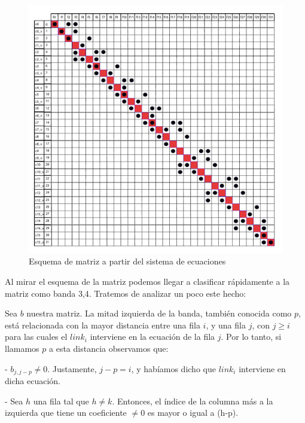 \begin{figure}[!h]
	\begin{center}
		  \includegraphics[scale=0.5]{Imagenes/im_2.pdf}
		  \caption{Esquema de matriz a partir del sistema de ecuaciones}
		  \label{fig:contra1}
	\end{center}
\end{figure}
\FloatBarrier

Al mirar el esquema de la matriz podemos llegar a clasificar rápidamente a la matriz como banda 3,4. Tratemos de analizar un poco este hecho:

Sea $b$ nuestra matriz. 
La mitad izquierda de la banda, también conocida como $p$, está relacionada con la mayor distancia entre una fila $i$, y una fila $j$, con $j \geq i$ para 
las cuales el $link_{i}$ interviene en la ecuación de la fila $j$. Por lo tanto, si llamamos $p$ a esta distancia observamos que:

- $b_{j,j-p} \neq 0$. Justamente, $j-p = i$, y habíamos dicho que $link_{i}$ interviene en dicha ecuación.

- Sea $h$ una fila tal que $h \neq k$. Entonces, el índice de la columna más a la izquierda que tiene un coeficiente $\neq 0$ es mayor o igual a (h-p).


